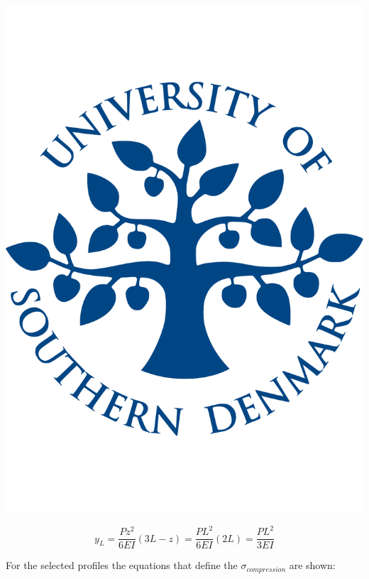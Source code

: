   \noindent\begin{minipage}{0.2\textwidth}%
    \includegraphics[width=\linewidth]{figures/sdu_logo.pdf}
  \end{minipage}%
  \hfill%
  \begin{minipage}{0.8\textwidth}
    \begin{equation}
    \label{eq:deformation}
      y_L = \frac{P z^2}{6EI}(3L-z) = \frac{P L^2}{6EI}(2L) = \frac{P L^2}{3EI}
    \end{equation}
  \end{minipage}


  For the selected profiles the equations that define the $\sigma _{compression}$ are shown:


